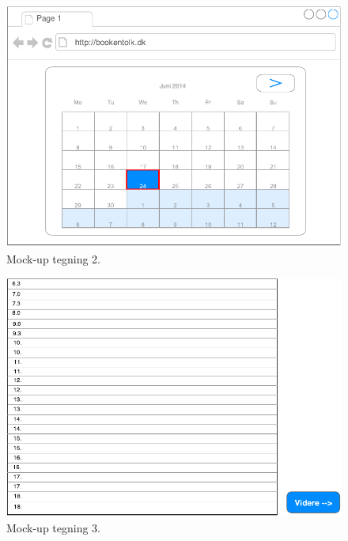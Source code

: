 \documentclass[12pt]{article}   %
\begin{document}
\newpage

\begin{figure}[!ht]
\begin{center}
\includegraphics{mock2.pdf}
\caption{Mock-up tegning 2.}
\end{center}
\end{figure}


\newpage

\begin{figure}[!ht]
\begin{center}
\includegraphics{mock3.pdf}
\caption{Mock-up tegning 3.}
\end{center}
\end{figure}


\newpage
\end{document}
